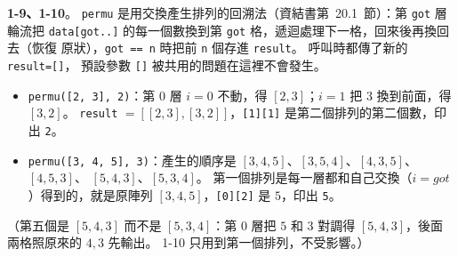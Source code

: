 \begin{pastsoln}
\textbf{1-9、1-10}。 \texttt{permu} 是用交換產生排列的回溯法（資結書第~20.1~節）：第 \texttt{got} 層
輪流把 \texttt{data[got..]} 的每一個數換到第 \texttt{got} 格，遞迴處理下一格，回來後再換回去（恢復
原狀），\texttt{got == n} 時把前 \texttt{n} 個存進 \texttt{result}。 呼叫時都傳了新的 \texttt{result=[]}，
預設參數 \texttt{[]} 被共用的問題在這裡不會發生。
\begin{itemize}
\item \texttt{permu([2, 3], 2)}：第 $0$ 層 $i = 0$ 不動，得 $[2, 3]$；$i = 1$ 把 $3$ 換到前面，得 $[3, 2]$。
\texttt{result} $= [[2, 3], [3, 2]]$，\texttt{[1][1]} 是第二個排列的第二個數，印出 \texttt{2}。
\item \texttt{permu([3, 4, 5], 3)}：產生的順序是 $[3, 4, 5]$、$[3, 5, 4]$、$[4, 3, 5]$、$[4, 5, 3]$、
$[5, 4, 3]$、$[5, 3, 4]$。 第一個排列是每一層都和自己交換（$i = \mathit{got}$）得到的，就是原陣列
$[3, 4, 5]$，\texttt{[0][2]} 是 $5$，印出 \texttt{5}。
\end{itemize}
（第五個是 $[5, 4, 3]$ 而不是 $[5, 3, 4]$：第 $0$ 層把 $5$ 和 $3$ 對調得 $[5, 4, 3]$，後面兩格照原來的
$4, 3$ 先輸出。 1-10 只用到第一個排列，不受影響。）
\end{pastsoln}
